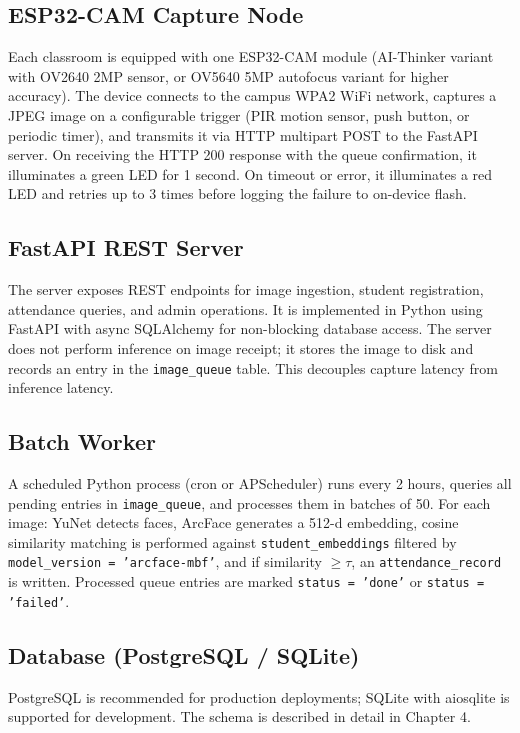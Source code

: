 \documentclass[12pt,a4paper]{report}
\begin{document}
\subsection{ESP32-CAM Capture Node}
Each classroom is equipped with one ESP32-CAM module (AI-Thinker variant with OV2640 2MP sensor, or OV5640 5MP autofocus variant for higher accuracy). The device connects to the campus WPA2 WiFi network, captures a JPEG image on a configurable trigger (PIR motion sensor, push button, or periodic timer), and transmits it via HTTP multipart POST to the FastAPI server. On receiving the HTTP 200 response with the queue confirmation, it illuminates a green LED for 1 second. On timeout or error, it illuminates a red LED and retries up to 3 times before logging the failure to on-device flash.

\subsection{FastAPI REST Server}
The server exposes REST endpoints for image ingestion, student registration, attendance queries, and admin operations. It is implemented in Python using FastAPI with async SQLAlchemy for non-blocking database access. The server does not perform inference on image receipt; it stores the image to disk and records an entry in the \texttt{image\_queue} table. This decouples capture latency from inference latency.

\subsection{Batch Worker}
A scheduled Python process (cron or APScheduler) runs every 2 hours, queries all pending entries in \texttt{image\_queue}, and processes them in batches of 50. For each image: YuNet detects faces, ArcFace generates a 512-d embedding, cosine similarity matching is performed against \texttt{student\_embeddings} filtered by \texttt{model\_version = 'arcface-mbf'}, and if similarity $\geq \tau$, an \texttt{attendance\_record} is written. Processed queue entries are marked \texttt{status = 'done'} or \texttt{status = 'failed'}.

\subsection{Database (PostgreSQL / SQLite)}
PostgreSQL is recommended for production deployments; SQLite with aiosqlite is supported for development. The schema is described in detail in Chapter 4.
\end{document}
